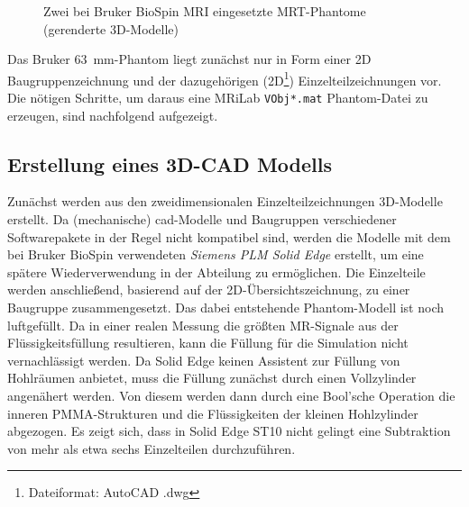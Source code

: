 \begin{figure}[H]
	\centering
	\hfill
	\caption[Bruker Phantome]{Zwei bei Bruker BioSpin MRI eingesetzte MRT-Phantome (gerenderte 3D-Modelle)}
\end{figure}

Das Bruker 63~mm-Phantom liegt zunächst nur in Form einer 2D Baugruppenzeichnung und der dazugehörigen (2D\footnote{Dateiformat: AutoCAD .dwg}) Einzelteilzeichnungen vor. Die nötigen Schritte, um daraus eine MRiLab \texttt{VObj*.mat} Phantom-Datei zu erzeugen, sind nachfolgend aufgezeigt.

\subsection{Erstellung eines 3D-CAD Modells}
Zunächst werden aus den zweidimensionalen Einzelteilzeichnungen 3D-Modelle erstellt. Da (mechanische) \gls{cad}-Modelle und Baugruppen verschiedener Softwarepakete in der Regel nicht kompatibel sind, werden die Modelle mit dem bei Bruker BioSpin verwendeten \textit{Siemens PLM Solid Edge} erstellt, um eine spätere Wiederverwendung in der Abteilung zu ermöglichen. Die Einzelteile werden anschließend, basierend auf der 2D-Übersichtszeichnung, zu einer Baugruppe zusammengesetzt. Das dabei entstehende Phantom-Modell ist noch luftgefüllt. Da in einer realen Messung die größten MR-Signale aus der Flüssigkeitsfüllung resultieren, kann die Füllung für die Simulation nicht vernachlässigt werden. Da Solid Edge keinen Assistent zur Füllung von Hohlräumen anbietet, muss die Füllung zunächst durch einen Vollzylinder angenähert werden. Von diesem werden dann durch eine Bool'sche Operation die inneren PMMA-Strukturen und die Flüssigkeiten der kleinen Hohlzylinder abgezogen. Es zeigt sich, dass in Solid Edge ST10 nicht gelingt eine Subtraktion von mehr als etwa sechs Einzelteilen durchzuführen.

